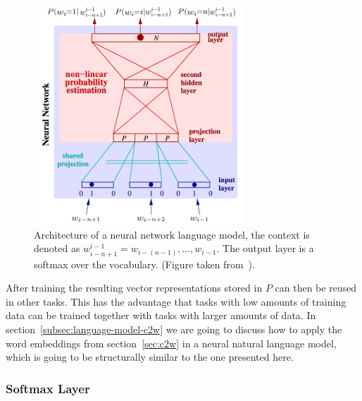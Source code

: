 \begin{figure}[H]
\begin{center}
  \includegraphics[width=0.7\textwidth]{./img/classic_nnlm}
  \caption{Architecture of a neural network language model, the context is denoted as $w_{i-n+1}^{i-1} = w_{i-(n-1)},\dots,w_{i-1}$.
  The output layer is a softmax over the vocabulary.
  (Figure taken from~\cite{Schwenk:2007:CSL:1230156.1230409}).}
  \label{fig:classic_nnlm}
\end{center}
\end{figure}

After training the resulting vector representations stored in $P$ can then be reused in other tasks.
This has the advantage that tasks with low amounts of training data can be trained together with tasks with larger amounts of data.
In section~\ref{subsec:language-model-c2w} we are going to discuss how to apply the word embeddings from section~\ref{sec:c2w} in
a neural natural language model, which is going to be structurally similar to the one presented here.

\subsubsection{Softmax Layer}
\label{subsec:softmax}

